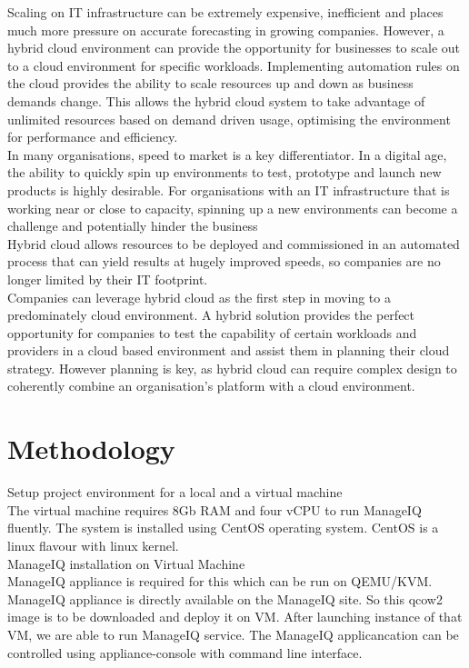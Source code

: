 \documentclass[a4paper,12pt]{report}
\begin{document}
Scaling on IT infrastructure can be extremely expensive, inefficient and places much more pressure on accurate forecasting in growing companies. However, a hybrid cloud environment can provide the opportunity for businesses to scale out to a cloud environment for specific workloads. Implementing automation rules on the cloud provides the ability to scale resources up and down as business demands change. This allows the hybrid cloud system to take advantage of unlimited resources based on demand driven usage, optimising the environment for performance and efficiency.\\

In many organisations, speed to market is a key differentiator. In a digital age, the ability to quickly spin up environments to test, prototype and launch new products is highly desirable. For organisations with an IT infrastructure that is working near or close to capacity, spinning up a new environments can become a challenge and potentially hinder the business\\

Hybrid cloud allows resources to be deployed and commissioned in an automated process that can yield results at hugely improved speeds, so companies are no longer limited by their IT footprint.\\

Companies can leverage hybrid cloud as the first step in moving to a predominately cloud environment. A hybrid solution provides the perfect opportunity for companies to test the capability of certain workloads and providers in a cloud based environment and assist them in planning their cloud strategy. However planning is key, as hybrid cloud can require complex design to coherently combine an organisation’s platform with a cloud environment.

\chapter{Methodology}

Setup project environment for a local and a virtual machine\\
The virtual machine requires 8Gb RAM and four vCPU to run ManageIQ fluently. The system is installed using CentOS operating system. CentOS is a linux flavour with linux kernel. \\

ManageIQ installation on Virtual Machine\\

ManageIQ appliance is required for this which can be run on QEMU/KVM. ManageIQ appliance is directly available on the ManageIQ site. So this qcow2 image is to be downloaded and deploy it on VM. After launching instance of that VM, we are able to run ManageIQ service. The ManageIQ applicancation can be controlled using appliance-console with command line interface.\\
\end{document}
